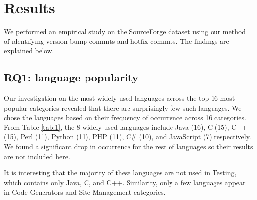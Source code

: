 \documentclass{sig-alternate}
\begin{document}
\section{Results}
We performed an empirical study on the SourceForge dataset using our method of identifying version bump commits and hotfix commits. The findings are explained below.
\subsection{RQ1: language popularity}
Our investigation on the most widely used languages across the top 16 most popular categories revealed that there are surprisingly few such languages. We chose the languages based on their frequency of occurrence across 16 categories. From Table \ref{tab:1}, the 8 widely used languages include Java (16), C (15), C++ (15), Perl (11), Python (11), PHP (11), C\# (10), and JavaScript (7) respectively.  We found a significant drop in occurrence for the rest of languages so their results are not included here.  %

It is interesting that the majority of these languages are not used in Testing, which contains only Java, C, and C++. Similarity, only a few languages appear in Code Generators and Site Management categories.

\end{document}
